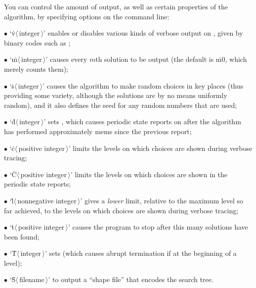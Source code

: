 You can control the amount of output, as well as certain properties
of the algorithm, by specifying options on the command line:
\smallskip\item{$\bullet$}
`\.v$\langle\,$integer$\,\rangle$' enables or disables various kinds of verbose
output on , given by binary codes such as ;
\item{$\bullet$}
`\.m$\langle\,$integer$\,\rangle$' causes every $m$th solution
to be output (the default is \.{m0}, which merely counts them);
\item{$\bullet$}
`\.s$\langle\,$integer$\,\rangle$' causes the algorithm to make
random choices in key places (thus providing some variety, although
the solutions are by no means uniformly random), and it also
defines the seed for any random numbers that are used;
\item{$\bullet$}
`\.d$\langle\,$integer$\,\rangle$' sets , which causes periodic
state reports on  after the algorithm has performed
approximately
 mems since the previous report;
\item{$\bullet$}
`\.c$\langle\,$positive integer$\,\rangle$' limits the levels on which
choices are shown during verbose tracing;
\item{$\bullet$}
`\.C$\langle\,$positive integer$\,\rangle$' limits the levels on which
choices are shown in the periodic state reports;
\item{$\bullet$}
`\.l$\langle\,$nonnegative integer$\,\rangle$' gives a {\it lower\/} limit,
relative to the maximum level so far achieved, to the levels on which
choices are shown during verbose tracing;
\item{$\bullet$}
`\.t$\langle\,$positive integer$\,\rangle$' causes the program to
stop after this many solutions have been found;
\item{$\bullet$}
`\.T$\langle\,$integer$\,\rangle$' sets  (which causes abrupt
termination if  at the beginning of a level);
\item{$\bullet$}
`\.S$\langle\,$filename$\,\rangle$' to output a ``shape file'' that encodes
the search tree.

